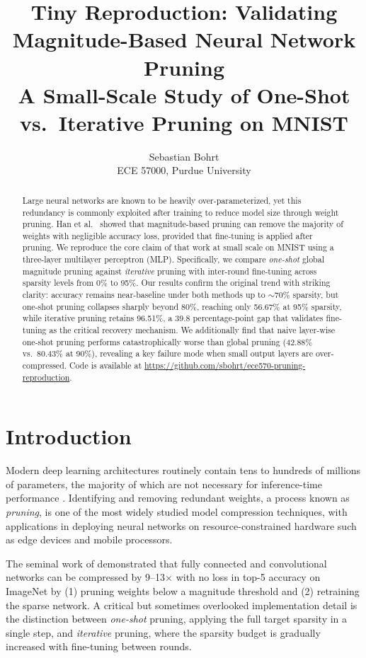 \documentclass{article}
\title{Tiny Reproduction: Validating Magnitude-Based Neural Network Pruning\\
\large A Small-Scale Study of One-Shot vs.\ Iterative Pruning on MNIST}
\author{%
  Sebastian Bohrt \\
  ECE 57000, Purdue University \\
}
\begin{document}
\maketitle

\begin{abstract}
Large neural networks are known to be heavily over-parameterized, yet this redundancy
is commonly exploited after training to reduce model size through weight pruning.
Han et al.\ \citeyear{han2015learning} showed that magnitude-based pruning can remove
the majority of weights with negligible accuracy loss, provided that fine-tuning is applied
after pruning.
We reproduce the core claim of that work at small scale on MNIST using a three-layer
multilayer perceptron (MLP).
Specifically, we compare \emph{one-shot} global magnitude pruning against
\emph{iterative} pruning with inter-round fine-tuning across sparsity levels from 0\%
to 95\%.
Our results confirm the original trend with striking clarity: accuracy remains
near-baseline under both methods up to ${\sim}$70\% sparsity, but one-shot pruning
collapses sharply beyond 80\%, reaching only 56.67\% at 95\% sparsity, while iterative
pruning retains 96.51\%, a 39.8 percentage-point gap that validates fine-tuning as the
critical recovery mechanism.
We additionally find that naive layer-wise one-shot pruning performs catastrophically
worse than global pruning (42.88\% vs.\ 80.43\% at 90\%), revealing a key failure mode
when small output layers are over-compressed.
Code is available at \url{https://github.com/sbohrt/ece570-pruning-reproduction}.
\end{abstract}

\section{Introduction}

Modern deep learning architectures routinely contain tens to hundreds of millions of
parameters, the majority of which are not necessary for inference-time performance
\citep{lecun1989optimal, han2015learning}.
Identifying and removing redundant weights, a process known as \emph{pruning}, is one
of the most widely studied model compression techniques, with applications in deploying
neural networks on resource-constrained hardware such as edge devices and mobile
processors.

The seminal work of \citet{han2015learning} demonstrated that fully connected and
convolutional networks can be compressed by 9--13$\times$ with no loss in top-5 accuracy
on ImageNet by (1) pruning weights below a magnitude threshold and (2) retraining the
sparse network.
A critical but sometimes overlooked implementation detail is the distinction between
\emph{one-shot} pruning, applying the full target sparsity in a single step, and
\emph{iterative} pruning, where the sparsity budget is gradually increased with fine-tuning
between rounds.
\end{document}

